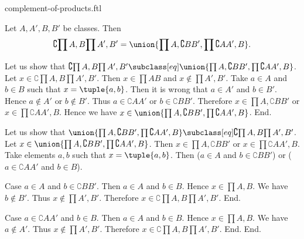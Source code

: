 \documentclass{article}
\begin{document}
\begin{smodule}[creators={Marcel Schütz}]{complement-of-products.ftl}

  \begin{fproposition*}[label=8691986596888576]
    Let $A, A', B, B'$ be classes.
    Then \[\complement{\prod{A,B}}{\prod{A',B'}} = \union{\prod{A,\complement{B}{B'}},\prod{\complement{A}{A'},B}}.\]
  \end{fproposition*}
  \begin{fproof}
    Let us show that $\complement{\prod{A,B}}{\prod{A',B'}} \subclass[eq] \union{\prod{A,\complement{B}{B'}},\prod{\complement{A}{A'},B}}$.
      Let $x \in \complement{\prod{A,B}}{\prod{A',B'}}$.
      Then $x \in \prod{A}{B}$ and $x \notin \prod{A',B'}$.
      Take $a \in A$ and $b \in B$ such that $x = \tuple{a,b}$.
      Then it is wrong that $a \in A'$ and $b \in B'$.
      Hence $a \notin A'$ or $b \notin B'$.
      Thus $a \in \complement{A}{A'}$ or $b \in \complement{B}{B'}$.
      Therefore $x \in \prod{A,\complement{B}{B'}}$ or
      $x \in \prod{\complement{A}{A'},B}$.
      Hence we have $x \in \union{\prod{A,\complement{B}{B'}},\prod{\complement{A}{A'},B}}$.
    End.

    Let us show that $\union{\prod{A,\complement{B}{B'}},\prod{\complement{A}{A'},B}} \subclass[eq] \complement{\prod{A,B}}{\prod{A',B'}}$.
      Let $x \in \union{\prod{A,\complement{B}{B'}},\prod{\complement{A}{A'},B}}$.
      Then $x \in \prod{A,\complement{B}{B'}}$ or $x \in \prod{\complement{A}{A'},B}$.
      Take elements $a,b$ such that $x = \tuple{a,b}$.
      Then ($a \in A$ and $b \in \complement{B}{B'}$) or ($a \in \complement{A}{A'}$ and $b \in B$).

      Case $a \in A$ and $b \in \complement{B}{B'}$.
        Then $a \in A$ and $b \in B$.
        Hence $x \in \prod{A,B}$.
        We have $b \notin B'$.
        Thus $x \notin \prod{A',B'}$.
        Therefore $x \in \complement{\prod{A,B}}{\prod{A',B'}}$.
      End.

      Case $a \in \complement{A}{A'}$ and $b \in B$.
        Then $a \in A$ and $b \in B$.
        Hence $x \in \prod{A,B}$.
        We have $a \notin A'$.
        Thus $x \notin \prod{A',B'}$.
        Therefore $x \in \complement{\prod{A,B}}{\prod{A',B'}}$.
      End.
    End.
  \end{fproof}
\end{smodule}
\end{document}

